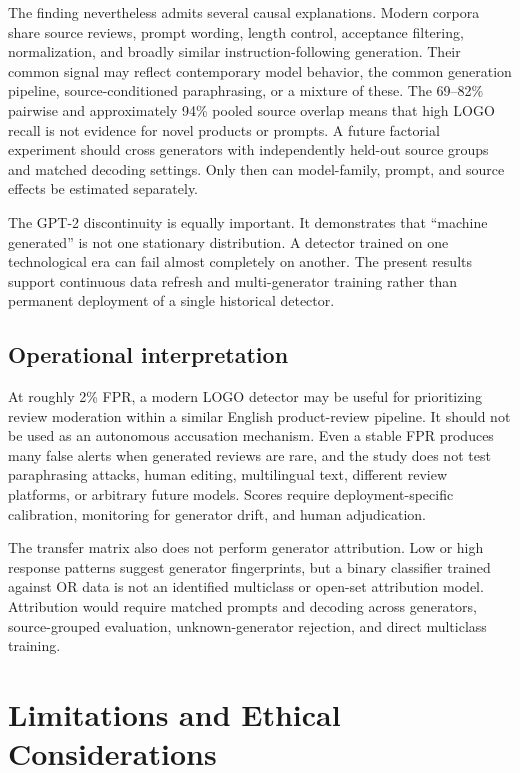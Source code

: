 \documentclass[utf8]{FrontiersinHarvard}
\begin{document}
The finding nevertheless admits several causal explanations. Modern corpora share source reviews, prompt wording, length control, acceptance filtering, normalization, and broadly similar instruction-following generation. Their common signal may reflect contemporary model behavior, the common generation pipeline, source-conditioned paraphrasing, or a mixture of these. The 69--82\% pairwise and approximately 94\% pooled source overlap means that high LOGO recall is not evidence for novel products or prompts. A future factorial experiment should cross generators with independently held-out source groups and matched decoding settings. Only then can model-family, prompt, and source effects be estimated separately.

The GPT-2 discontinuity is equally important. It demonstrates that ``machine generated'' is not one stationary distribution. A detector trained on one technological era can fail almost completely on another. The present results support continuous data refresh and multi-generator training rather than permanent deployment of a single historical detector.

\subsection{Operational interpretation}

At roughly 2\% FPR, a modern LOGO detector may be useful for prioritizing review moderation within a similar English product-review pipeline. It should not be used as an autonomous accusation mechanism. Even a stable FPR produces many false alerts when generated reviews are rare, and the study does not test paraphrasing attacks, human editing, multilingual text, different review platforms, or arbitrary future models. Scores require deployment-specific calibration, monitoring for generator drift, and human adjudication.

The transfer matrix also does not perform generator attribution. Low or high response patterns suggest generator fingerprints, but a binary classifier trained against OR data is not an identified multiclass or open-set attribution model. Attribution would require matched prompts and decoding across generators, source-grouped evaluation, unknown-generator rejection, and direct multiclass training.

\section{Limitations and Ethical Considerations}
\end{document}
